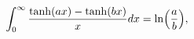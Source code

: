 \[{\int_{0}^{\infty}\frac{\mathop{\tanh\/}\nolimits\!\left(ax\right)-\mathop{%
\tanh\/}\nolimits\!\left(bx\right)}{x}dx=\mathop{\ln\/}\nolimits\!\left(\frac{%
a}{b}\right)},\]